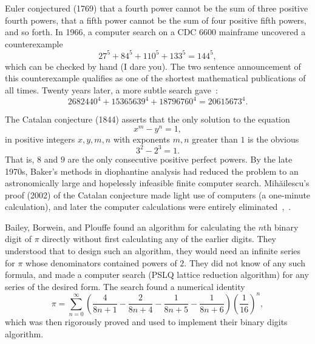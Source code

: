\documentclass{llncs}
\begin{document}
Euler conjectured (1769) that a fourth power cannot
be the sum of three positive fourth powers, that a fifth power cannot be the sum of four positive fifth powers, and so forth.  
In 1966, a computer search \cite{LP66} on a CDC 6600 mainframe uncovered a counterexample 
\[
27^5 + 84^5 + 110^5 + 133^5 = 144^5,
\]
which can be checked by hand (I dare you). 
The two sentence announcement of this counterexample qualifies as one of the shortest mathematical publications of all times.
Twenty years later, a more subtle search
gave~\cite{Elkies88}:
\[
2682440^4 + 15365639^4 + 18796760^4 = 20615673^4.
\]


The Catalan conjecture (1844) asserts that the only solution to the equation
\[
x^m - y^n = 1,
\]
in positive integers $x,y,m,n$ with exponents $m,n$ greater than $1$
is the obvious
\[
3^2 - 2^3 = 1.
\]
That is, $8$ and $9$ are the only consecutive positive perfect powers.
By the late 1970s, Baker's methods in diophantine analysis had reduced
the problem to an astronomically large and hopelessly infeasible finite
computer search.  Mih\u ailescu's proof (2002) of the Catalan
conjecture made light use of computers (a one-minute calculation), and
later the computer calculations were entirely eliminated~\cite{Mih},~\cite{TM03}.


Bailey, Borwein, and Plouffe found an algorithm for calculating the
$n$th binary digit of $\pi$ directly without first calculating any of the
earlier digits.  They understood that to design such an algorithm,
they would need an infinite series for $\pi$ whose denominators
contained powers of $2$.  They did not know of any such formula, and
made a computer search (PSLQ lattice reduction algorithm) for any
series of the desired form.  The search found a numerical identity
\[
\pi = \sum_{n=0}^\infty 
\left(
\frac{4}{8n+1} - \frac{2}{8n+4} - \frac{1}{8n+5} - \frac{1}{8n+6}
\right) 
\left(\frac{1}{16}\right)^n,
\]
which was then rigorously proved and used to implement their binary
digits algorithm.


\end{document}
